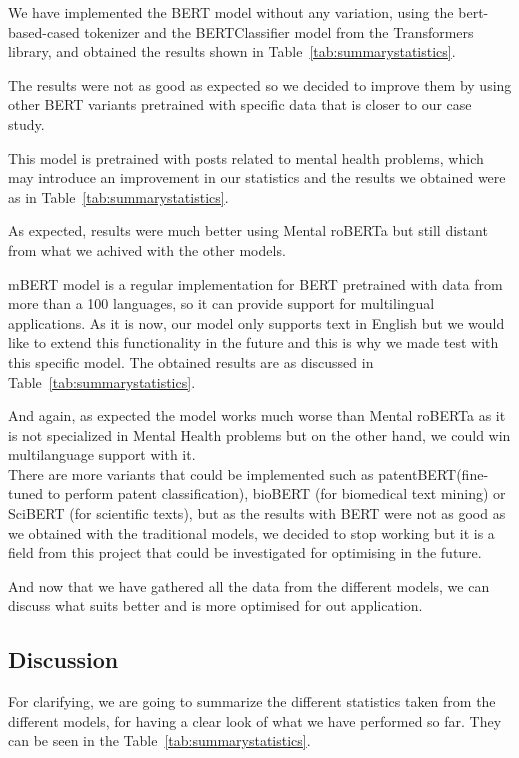 We have implemented the BERT model without any variation, using the bert-based-cased tokenizer and the BERTClassifier model from the Transformers library, and obtained the results shown in Table~\ref{tab:summarystatistics}.


The results were not as good as expected so we decided to improve them by using other BERT variants pretrained with specific data that is closer to our case study.

This model is pretrained with posts related to mental health problems, which may introduce an improvement in our statistics and the results we obtained were as in Table~\ref{tab:summarystatistics}.

As expected, results were much better using Mental roBERTa but still distant from what we achived with the other models.

mBERT model is a regular implementation for BERT pretrained with data from more than a 100 languages, so it can provide support for multilingual applications. As it is now, our model only supports text in English but we would like to extend this functionality in the future and this is why we made test with this specific model. The obtained results are as discussed in Table~\ref{tab:summarystatistics}.

And again, as expected the model works much worse than Mental roBERTa as it is not specialized in Mental Health problems but on the other hand, we could win multilanguage support with it. \\

There are more variants that could be implemented such as patentBERT(fine-tuned to perform patent classification), bioBERT (for biomedical text mining) or SciBERT (for scientific texts), but as the results with BERT were not as good as we obtained with the traditional models, we decided to stop working but it is a field from this project that could be investigated for optimising in the future.

And now that we have gathered all the data from the different models, we can discuss what suits better and is more optimised for out application.

\subsection{Discussion}
For clarifying, we are going to summarize the different statistics taken from the different models, for having a clear look of what we have performed so far. They can be seen in the Table~\ref{tab:summarystatistics}.

